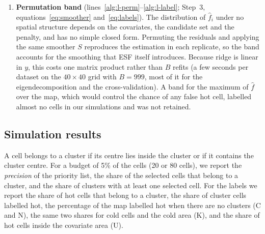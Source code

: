 \begin{enumerate}
\item\label{ch:band} \textbf{Permutation band} (lines~\ref{alg:l-perm}--\ref{alg:l-label}; Step~3, equations~\eqref{eq:smoother} and~\eqref{eq:labels}).
The distribution of $\hat f_i$ under no spatial structure depends on the covariates, the candidate set and the penalty, and has no simple closed form. Permuting the residuals and applying the same smoother $S$ reproduces the estimation in each replicate, so the band accounts for the smoothing that ESF itself introduces. Because ridge is linear in $y$, this costs one matrix product rather than $B$ refits (a few seconds per dataset on the $40\times40$ grid with $B=999$, most of it for the eigendecomposition and the cross-validation). A band for the maximum of $\hat f$ over the map, which would control the chance of any false hot cell, labelled almost no cells in our simulations and was not retained.

\end{enumerate}


\subsection{Simulation results}\label{sec:sim-results}

A cell belongs to a cluster if its centre lies inside the cluster or if it contains the cluster centre. For a budget of 5\% of the cells (20 or 80 cells), we report the \emph{precision} of the priority list, the share of the selected cells that belong to a cluster, and the share of clusters with at least one selected cell. For the labels we report the share of hot cells that belong to a cluster, the share of cluster cells labelled hot, the percentage of the map labelled hot when there are no clusters (C and N), the same two shares for cold cells and the cold area (K), and the share of hot cells inside the covariate area (U).

